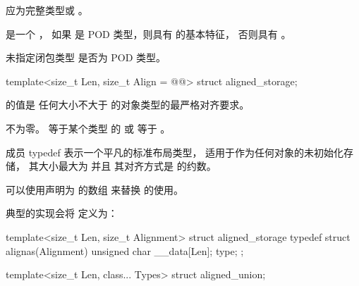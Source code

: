 \begin{itemdescr}
\pnum
\expects
{} 应为完整类型或 \cv{} 。

\pnum
\remarks
{} 是一个 ，
如果  是 POD 类型，则具有  的基本特征，
否则具有 。

\pnum
\begin{note}
未指定闭包类型 是否为 POD 类型。
\end{note}
\end{itemdescr}

%
\begin{itemdecl}
template<size_t Len, size_t Align = @@>
  struct aligned_storage;
\end{itemdecl}

\begin{itemdescr}
\pnum
{} 的值是
任何大小不大于  的对象类型的最严格对齐要求。

\pnum
\mandates
{} 不为零。
 等于某个类型  的  或
等于 。

\pnum
成员 typedef  表示一个平凡的标准布局类型，
适用于作为任何对象的未初始化存储，
其大小最大为  并且
其对齐方式是  的约数。

\pnum
\begin{note}
可以使用声明为  的数组  来替换  的使用。
\end{note}

\pnum
\begin{note}
典型的实现会将  定义为：
\begin{codeblock}
template<size_t Len, size_t Alignment>
struct aligned_storage {
  typedef struct {
    alignas(Alignment) unsigned char __data[Len];
  } type;
};
\end{codeblock}
\end{note}

\end{itemdescr}

%
\begin{itemdecl}
template<size_t Len, class... Types>
  struct aligned_union;
\end{itemdecl}

